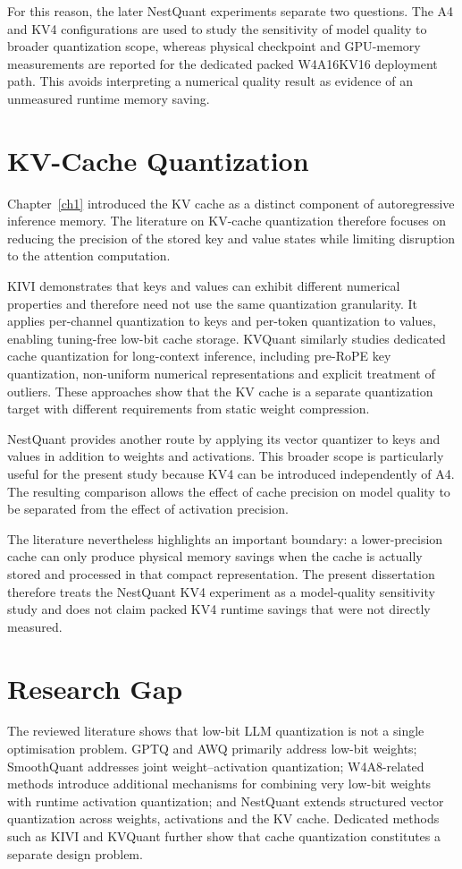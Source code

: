 For this reason, the later NestQuant experiments separate two questions.
The A4 and KV4 configurations are used to study the sensitivity of model
quality to broader quantization scope, whereas physical checkpoint and
\ac{GPU}-memory measurements are reported for the dedicated packed
W4A16KV16 deployment path. This avoids interpreting a numerical
quality result as evidence of an unmeasured runtime memory saving.

\section{KV-Cache Quantization}
Chapter~\ref{ch1} introduced the KV cache as a distinct component of
autoregressive inference memory. The literature on KV-cache quantization
therefore focuses on reducing the precision of the stored key and value
states while limiting disruption to the attention computation\cite{pmlr-v235-liu24bz}.

KIVI demonstrates that keys and values can exhibit different numerical
properties and therefore need not use the same quantization granularity.
It applies per-channel quantization to keys and per-token quantization to
values, enabling tuning-free low-bit cache storage. KVQuant similarly studies dedicated cache
quantization for long-context inference, including pre-RoPE key
quantization, non-uniform numerical representations and explicit
treatment of outliers\cite{hooper2025kvquant10millioncontext}. These approaches show that the KV cache is a
separate quantization target with different requirements from static
weight compression.

NestQuant provides another route by applying its vector quantizer to
keys and values in addition to weights and activations. This broader scope is
particularly useful for the present study because KV4 can be introduced
independently of A4. The resulting comparison allows the effect of
cache precision on model quality to be separated from the effect of
activation precision.

The literature nevertheless highlights an important boundary: a
lower-precision cache can only produce physical memory savings when the
cache is actually stored and processed in that compact representation\cite{yue2024wkvquantquantizingweightkeyvalue}.
The present dissertation therefore treats the NestQuant KV4 experiment
as a model-quality sensitivity study and does not claim packed KV4
runtime savings that were not directly measured.

\section{Research Gap}
The reviewed literature shows that low-bit LLM quantization is not a
single optimisation problem. GPTQ and AWQ primarily address low-bit
weights; SmoothQuant addresses joint weight--activation quantization;
W4A8-related methods introduce additional mechanisms for combining very
low-bit weights with runtime activation quantization; and NestQuant
extends structured vector quantization across weights, activations and
the KV cache. Dedicated methods such as KIVI and KVQuant further show
that cache quantization constitutes a separate design problem.

